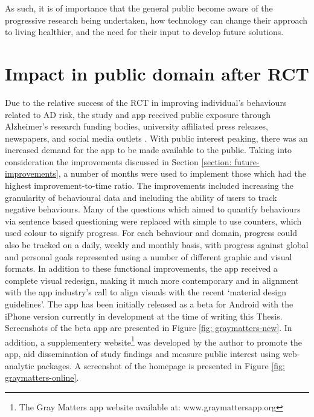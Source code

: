 As such, it is of importance that the general public become aware of the progressive research being undertaken, how technology can change their approach to living healthier, and the need for their input to develop future solutions.

\section{Impact in public domain after RCT}
Due to the relative success of the RCT in improving individual's behaviours related to AD risk, the study and app received public exposure through Alzheimer's research funding bodies, university affiliated press releases, newspapers, and social media outlets \cite{graymatterspress1,graymatterspress2,graymatterspress3,graymatterspress4}. With public interest peaking, there was an increased demand for the app to be made available to the public. Taking into consideration the improvements discussed in Section \ref{section: future-improvements}, a number of months were used to implement those which had the highest improvement-to-time ratio. The improvements included increasing the granularity of behavioural data and including the ability of users to track negative behaviours. Many of the questions which aimed to quantify behaviours via sentence based questioning were replaced with simple to use counters, which used colour to signify progress. For each behaviour and domain, progress could also be tracked on a daily, weekly and monthly basis, with progress against global and personal goals represented using a number of different graphic and visual formats.
In addition to these functional improvements, the app received a complete visual redesign, making it much more contemporary and in alignment with the app industry's call to align visuals with the recent `material design guidelines'. The app has been initially released as a beta for Android with the iPhone version currently in development at the time of writing this Thesis. Screenshots of the beta app are presented in Figure \ref{fig: graymatters-new}. In addition, a supplementery website\footnote{The Gray Matters app website available at: www.graymattersapp.org} was developed by the author to promote the app, aid dissemination of study findings and measure public interest using web-analytic packages. A screenshot of the homepage is presented in Figure \ref{fig: graymatters-online}.


